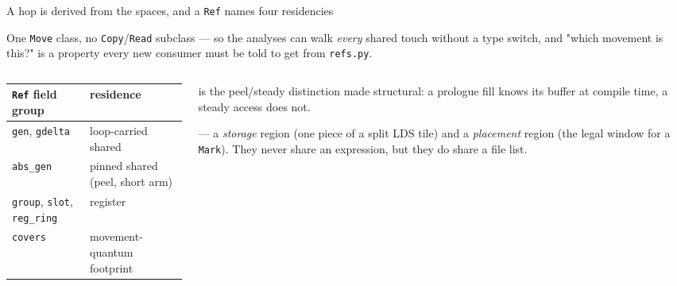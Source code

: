 \begin{frame}{A hop is derived from the spaces, and a \texttt{Ref} names four residencies}
\centering
{}

\vspace{2pt}
{\scriptsize One \texttt{Move} class, no \texttt{Copy}/\texttt{Read} subclass --- so the analyses can walk
\emph{every} shared touch without a type switch, and "which movement is this?" is a
 property every new consumer must be told to get from \texttt{refs.py}.}

\vspace{5pt}
\begin{columns}[T]
\begin{column}{0.52\textwidth}
\scriptsize
\begin{tabular}{@{}ll@{}}
\toprule
\texttt{Ref} field group & residence \\
\midrule
\texttt{gen}, \texttt{gdelta}         & loop-carried shared \\
\texttt{abs\_gen}                     & pinned shared (peel, short arm) \\
\texttt{group}, \texttt{slot}, \texttt{reg\_ring} & register \\
\texttt{covers}                       & movement-quantum footprint \\
\bottomrule
\end{tabular}
\end{column}
\begin{column}{0.46\textwidth}
\scriptsize
{} is the peel/steady distinction made structural: a
prologue fill knows its buffer at compile time, a steady access does not.

\vspace{3pt}
 --- a \emph{storage} region (one piece of a split
LDS tile) and a \emph{placement} region (the legal window for a \texttt{Mark}).
They never share an expression, but they do share a file list.
\end{column}
\end{columns}
\end{frame}
